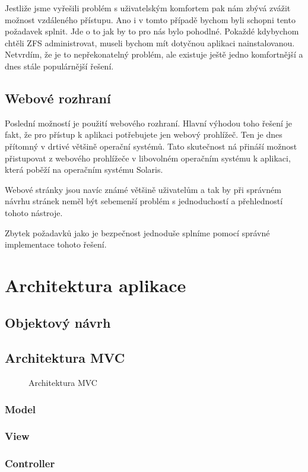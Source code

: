     Jestliže jsme vyřešili problém s uživatelským komfortem pak nám zbývá zvážit možnost vzdáleného přístupu. Ano i v tomto případě bychom byli schopni tento požadavek splnit. Jde o to jak by to pro nás bylo pohodlné. Pokaždé kdybychom chtěli ZFS administrovat, museli bychom mít dotyčnou aplikaci nainstalovanou. Netvrdím, že je to nepřekonatelný problém, ale existuje ještě jedno komfortnější a dnes stále populárnější řešení.
    \subsection{Webové rozhraní}
    Poslední možností je použití webového rozhraní. Hlavní výhodou toho řešení je fakt, že pro přístup k aplikaci potřebujete jen webový prohlížeč. Ten je dnes přítomný v drtivé většině operační systémů. Tato skutečnost ná přináší možnost přistupovat z webového prohlížeče v libovolném operačním systému k aplikaci, která poběží na operačním systému Solaris.
    
    Webové stránky jsou navíc známé většině uživatelům a tak by při správném návrhu stránek neměl být sebemenší problém s jednoduchostí a přehledností tohoto nástroje.
    
    Zbytek požadavků jako je bezpečnost jednoduše splníme pomocí správné implementace tohoto řešení.
\section{Architektura aplikace}
                                                         
    \subsection{Objektový návrh}
    \subsection{Architektura MVC}    
    \begin{figure}[h]
        \caption{Architektura MVC}
        \label{mvc}
    \end{figure}
        \subsubsection{Model}
        \subsubsection{View}
        \subsubsection{Controller}
